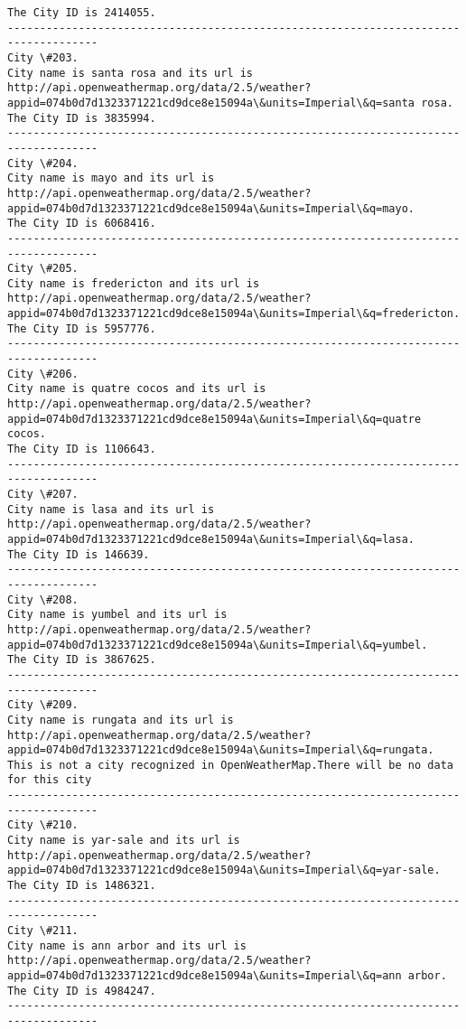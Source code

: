 \documentclass[11pt]{article}
\begin{document}
\begin{Verbatim}[commandchars=\\\{\}]
The City ID is 2414055.
------------------------------------------------------------------------------------
City \#203.
City name is santa rosa and its url is http://api.openweathermap.org/data/2.5/weather?appid=074b0d7d1323371221cd9dce8e15094a\&units=Imperial\&q=santa rosa.
The City ID is 3835994.
------------------------------------------------------------------------------------
City \#204.
City name is mayo and its url is http://api.openweathermap.org/data/2.5/weather?appid=074b0d7d1323371221cd9dce8e15094a\&units=Imperial\&q=mayo.
The City ID is 6068416.
------------------------------------------------------------------------------------
City \#205.
City name is fredericton and its url is http://api.openweathermap.org/data/2.5/weather?appid=074b0d7d1323371221cd9dce8e15094a\&units=Imperial\&q=fredericton.
The City ID is 5957776.
------------------------------------------------------------------------------------
City \#206.
City name is quatre cocos and its url is http://api.openweathermap.org/data/2.5/weather?appid=074b0d7d1323371221cd9dce8e15094a\&units=Imperial\&q=quatre cocos.
The City ID is 1106643.
------------------------------------------------------------------------------------
City \#207.
City name is lasa and its url is http://api.openweathermap.org/data/2.5/weather?appid=074b0d7d1323371221cd9dce8e15094a\&units=Imperial\&q=lasa.
The City ID is 146639.
------------------------------------------------------------------------------------
City \#208.
City name is yumbel and its url is http://api.openweathermap.org/data/2.5/weather?appid=074b0d7d1323371221cd9dce8e15094a\&units=Imperial\&q=yumbel.
The City ID is 3867625.
------------------------------------------------------------------------------------
City \#209.
City name is rungata and its url is http://api.openweathermap.org/data/2.5/weather?appid=074b0d7d1323371221cd9dce8e15094a\&units=Imperial\&q=rungata.
This is not a city recognized in OpenWeatherMap.There will be no data for this city
------------------------------------------------------------------------------------
City \#210.
City name is yar-sale and its url is http://api.openweathermap.org/data/2.5/weather?appid=074b0d7d1323371221cd9dce8e15094a\&units=Imperial\&q=yar-sale.
The City ID is 1486321.
------------------------------------------------------------------------------------
City \#211.
City name is ann arbor and its url is http://api.openweathermap.org/data/2.5/weather?appid=074b0d7d1323371221cd9dce8e15094a\&units=Imperial\&q=ann arbor.
The City ID is 4984247.
------------------------------------------------------------------------------------

\end{Verbatim}
\end{document}
